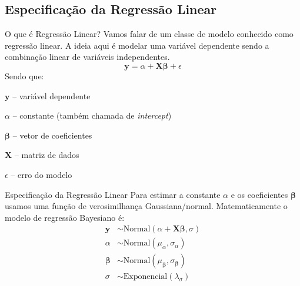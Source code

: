 \subsection{Especificação da Regressão Linear}
\begin{frame}{O que é Regressão Linear?}
    Vamos falar de um classe de modelo conhecido como regressão linear.
    A ideia aqui é modelar uma variável dependente sendo a combinação linear de
    variáveis independentes.
    $$
    \boldsymbol{y} = \alpha +  \mathbf{X} \boldsymbol{\beta} + \epsilon
    $$
    Sendo que:
    \begin{vfilleditems}
        \item $\boldsymbol{y}$ -- variável dependente
        \item $\alpha$ -- constante (também chamada de \textit{intercept})
        \item $\boldsymbol{\beta}$ -- vetor de coeficientes
        \item $\mathbf{X}$ -- matriz de dados
        \item $\epsilon$ -- erro do modelo
    \end{vfilleditems}
\end{frame}

\begin{frame}{Especificação da Regressão Linear}
    Para estimar a constante $\alpha$ e os coeficientes $\boldsymbol{\beta}$ usamos uma função de verosimilhança
    Gaussiana/normal. Matematicamente o modelo de regressão Bayesiano é:
    $$
    \begin{aligned}
        \boldsymbol{y} &\sim \text{Normal}\left( \alpha +  \mathbf{X} \boldsymbol{\beta}, \sigma \right) \\
        \alpha &\sim \text{Normal}(\mu_\alpha, \sigma_\alpha) \\
        \boldsymbol{\beta} &\sim \text{Normal}(\mu_{\boldsymbol{\beta}}, \sigma_{\boldsymbol{\beta}}) \\
        \sigma &\sim \text{Exponencial}(\lambda_\sigma)
    \end{aligned}
    $$
\end{frame}

